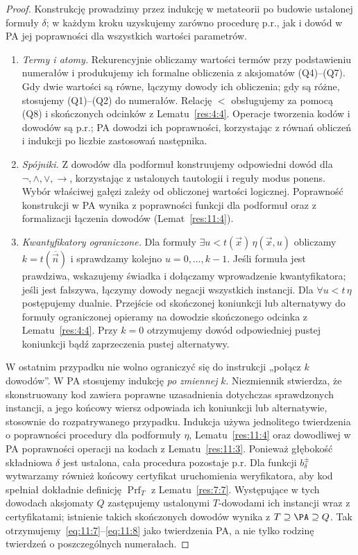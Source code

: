 \begin{proof}
Konstrukcję prowadzimy przez indukcję w metateorii po budowie ustalonej formuły $\delta$; w każdym kroku uzyskujemy zarówno procedurę p.r., jak i dowód w PA jej poprawności dla wszystkich wartości parametrów.
\begin{enumerate}[label=(\alph*)]
\item \emph{Termy i atomy.} Rekurencyjnie obliczamy wartości termów przy podstawieniu numerałów i produkujemy ich formalne obliczenia z aksjomatów (Q4)--(Q7). Gdy dwie wartości są równe, łączymy dowody ich obliczenia; gdy są różne, stosujemy (Q1)--(Q2) do numerałów. Relację $<$ obsługujemy za pomocą (Q8) i skończonych odcinków z Lematu~\ref{res:4:4}. Operacje tworzenia kodów i dowodów są p.r.; PA dowodzi ich poprawności, korzystając z równań obliczeń i indukcji po liczbie zastosowań następnika.
\item \emph{Spójniki.} Z dowodów dla podformuł konstruujemy odpowiedni dowód dla $\neg,\land,\lor,\to$, korzystając z ustalonych tautologii i reguły modus ponens. Wybór właściwej gałęzi zależy od obliczonej wartości logicznej. Poprawność konstrukcji w PA wynika z poprawności funkcji dla podformuł oraz z formalizacji łączenia dowodów (Lemat~\ref{res:11:4}).
\item \emph{Kwantyfikatory ograniczone.} Dla formuły $\exists u<t(\vec x)\,\eta(\vec x,u)$ obliczamy $k=t(\overline{\vec n})$ i sprawdzamy kolejno $u=0,\ldots,k-1$. Jeśli formuła jest prawdziwa, wskazujemy świadka i dołączamy wprowadzenie kwantyfikatora; jeśli jest fałszywa, łączymy dowody negacji wszystkich instancji. Dla $\forall u<t\,\eta$ postępujemy dualnie. Przejście od skończonej koniunkcji lub alternatywy do formuły ograniczonej opieramy na dowodzie skończonego odcinka z Lematu~\ref{res:4:4}. Przy $k=0$ otrzymujemy dowód odpowiedniej pustej koniunkcji bądź zaprzeczenia pustej alternatywy.
\end{enumerate}

W ostatnim przypadku nie wolno ograniczyć się do instrukcji „połącz $k$ dowodów”. W PA stosujemy indukcję \emph{po zmiennej} $k$. Niezmiennik stwierdza, że skonstruowany kod zawiera poprawne uzasadnienia dotychczas sprawdzonych instancji, a jego końcowy wiersz odpowiada ich koniunkcji lub alternatywie, stosownie do rozpatrywanego przypadku. Indukcja używa jednolitego twierdzenia o poprawności procedury dla podformuły $\eta$, Lematu~\ref{res:11:4} oraz dowodliwej w PA poprawności operacji na kodach z Lematu~\ref{res:11:3}. Ponieważ głębokość składniowa $\delta$ jest ustalona, cała procedura pozostaje p.r. Dla funkcji $b_\delta^\pm$ wytwarzamy również końcowy certyfikat uruchomienia weryfikatora, aby kod spełniał dokładnie definicję $\operatorname{Prf}_T$ z Lematu~\ref{res:7:7}. Występujące w tych dowodach aksjomaty $Q$ zastępujemy ustalonymi $T$-dowodami ich instancji wraz z certyfikatami; istnienie takich skończonych dowodów wynika z $T\supseteq\PA\supseteq Q$. Tak otrzymujemy~\eqref{eq:11:7}--\eqref{eq:11:8} jako twierdzenia PA, a nie tylko rodzinę twierdzeń o poszczególnych numerałach.


\end{proof}
